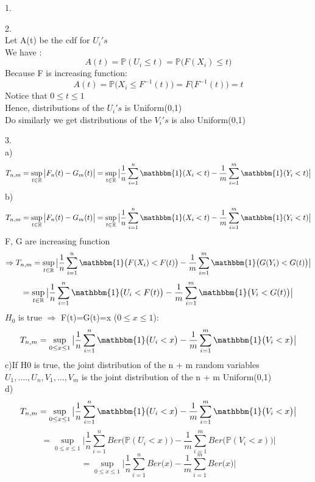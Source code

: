 \documentclass[10pt]{article}
\newenvironment{problem}[2][Problem]{\begin{trivlist}
\item[\hskip \labelsep {\bfseries #1}\hskip \labelsep {\bfseries #2.}]}{\end{trivlist}}
\begin{document}
\begin{problem}{2}
\item 1.

\item 2. \\
Let A(t) be the cdf for $U_i's$ \\
We have :\\
\[A(t)= \mathbb{P}(U_i \leq t)=\mathbb{P}\big(F(X_i)\leq t\big)\]
Because F is increasing function:
\[A(t)= \mathbb{P}\big(X_i\leq F^{-1}(t)\big)=F\big(F^{-1}(t) \big)=t\]
Notice that $0\leq t \leq 1$ \\
Hence, distributions of the $U_i's$ is Uniform(0,1)\\
Do similarly we get distributions of the $V_i's$ is also Uniform(0,1) \\

\item 3.\\
a) \\
\[T_{n,m}=\sup_{t\in \mathbb{R}}\big|F_n(t)-G_m(t) \big|=\sup_{t\in \mathbb{R}}\big|\frac{1}{n} \sum_{i=1}^{n}\mathbbm{1}(X_i < t) -\frac{1}{m} \sum_{i=1}^{m}\mathbbm{1}(Y_i < t) \big|\]
b) \\
\[T_{n,m}=\sup_{t\in \mathbb{R}}\big|F_n(t)-G_m(t) \big|=\sup_{t\in \mathbb{R}}\big|\frac{1}{n} \sum_{i=1}^{n}\mathbbm{1}(X_i < t) -\frac{1}{m} \sum_{i=1}^{m}\mathbbm{1}(Y_i < t) \big|\]
F, G are increasing function 
\[\Rightarrow T_{n,m}= \sup_{t\in \mathbb{R}}\big|\frac{1}{n} \sum_{i=1}^{n}\mathbbm{1}\big(F(X_i) < F(t)\big) -\frac{1}{m} \sum_{i=1}^{m}\mathbbm{1}\big(G(Y_i) < G(t)\big) \big|\]
\[=\sup_{t\in \mathbb{R}}\big|\frac{1}{n} \sum_{i=1}^{n}\mathbbm{1}\big(U_i < F(t)\big) -\frac{1}{m} \sum_{i=1}^{m}\mathbbm{1}\big(V_i < G(t)\big) \big|\]
$H_0$ is true $\Rightarrow$ F(t)=G(t)=x ($0 \leq x \leq 1$):
\[T_{n,m}=\sup_{0 \leq x \leq 1}\big|\frac{1}{n} \sum_{i=1}^{n}\mathbbm{1}\big(U_i < x\big) -\frac{1}{m} \sum_{i=1}^{m}\mathbbm{1}\big(V_i < x\big) \big|\]
c)If H0 is true, the joint distribution of the n + m random variables $U_1,....,U_n,V_1,...,V_m$ is the joint distribution of the n + m Uniform(0,1)\\
d) \\
\[T_{n,m}=\sup_{0 \leq x \leq 1}\big|\frac{1}{n} \sum_{i=1}^{n}\mathbbm{1}\big(U_i < x\big) -\frac{1}{m} \sum_{i=1}^{m}\mathbbm{1}\big(V_i < x\big) \big|\]
\[=\sup_{0 \leq x \leq 1}\big|\frac{1}{n} \sum_{i=1}^{n}Ber\big(\mathbb{P}(U_i < x)\big) -\frac{1}{m} \sum_{i=1}^{m}Ber\big(\mathbb{P}(V_i < x)\big) \big|\]
\[=\sup_{0 \leq x \leq 1}\big|\frac{1}{n} \sum_{i=1}^{n}Ber\big(x\big) -\frac{1}{m} \sum_{i=1}^{m}Ber\big(x\big) \big|\]


\end{problem}
\end{document}

